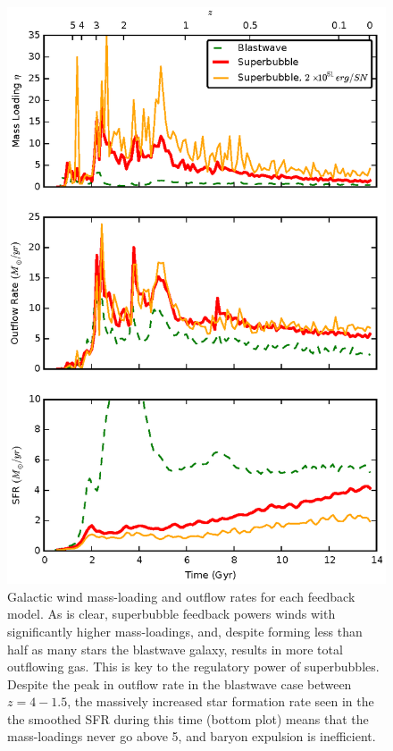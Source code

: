 \begin{figure}
    \includegraphics[width=\textwidth]{figures2/massloading.eps}
    \caption[Galactic wind mass loading for different feedback models]{Galactic
    wind mass-loading and outflow rates for each feedback model.  As is clear,
    superbubble feedback powers winds with significantly higher mass-loadings,
    and, despite forming less than half as many stars the blastwave galaxy,
    results in more total outflowing gas.  This is key to the regulatory power
    of superbubbles.  Despite the peak in outflow rate in the blastwave case
    between $z=4-1.5$, the massively increased star formation rate seen in the
    the smoothed SFR during this time (bottom plot) means that the mass-loadings
    never go above 5, and baryon expulsion is inefficient.}
    \label{massloading}
\end{figure}
